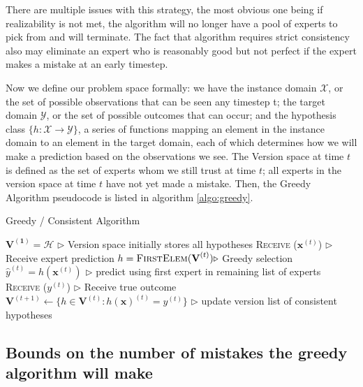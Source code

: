 \documentclass[11pt]{article}
\newcommand\X{\mathcal{X}}
\newcommand\Y{\mathcal{Y}}
\begin{document}
There are multiple issues with this strategy, the most obvious one being if realizability is not met, the algorithm will no longer have a pool of experts to pick from and will terminate. The fact that algorithm requires strict consistency also may eliminate an expert who is reasonably good but not perfect if the expert makes a mistake at an early timestep.

Now we define our problem space formally: we have the instance domain $\X$, or the set of possible observations that can be seen any timestep t; the target domain $\Y$, or the set of possible outcomes that can occur; and the hypothesis class $\{h: \X \rightarrow \Y \}$, a series of functions mapping an element in the instance domain to an element in the target domain, each of which determines how we will make a prediction based on the observations we see. The Version space at time $t$ is defined as the set of experts whom we still trust at time $t$; all experts in the version space at time $t$ have not yet made a mistake. Then, the Greedy Algorithm pseudocode is listed in algorithm \ref{algo:greedy}.

\begin{algorithm}[H]
\caption{Greedy / Consistent Algorithm}
\label{algo:greedy}
\begin{algorithmic}[1]
\STATE $\mathbf{V^{(1)}} = \mathcal{H}$  \hfill $\triangleright$ Version space initially stores all hypotheses
\STATE \textsc{Receive} ($\textbf{x}^{(t)}$) \hfill $\triangleright$ Receive expert prediction
\STATE $h =\textsc{FirstElem}(\textbf{V}^{(t)}) \hfill \triangleright$ Greedy selection 
\STATE $\hat{y}^{(t)} = h(\mathbf{x}^{(t)})$ \hfill $\triangleright$ predict using first expert in remaining list of experts
\STATE \textsc{Receive} ($y^{(t)}$) \hfill $\triangleright$ Receive true outcome
\STATE $\mathbf{V}^{(t+1)}\leftarrow \{ h \in \mathbf{V}^{(t)} : h(\textbf{x})^{(t)}=y^{(t)} \}$ \hfill $\triangleright$ update version list of consistent hypotheses
\ENDFOR
\end{algorithmic}
\end{algorithm}

\subsection{Bounds on the number of mistakes the greedy algorithm will make}
\end{document}
